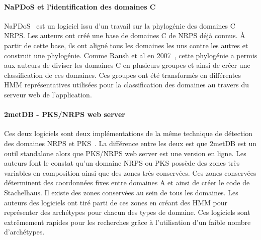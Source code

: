 \documentclass[12pt,french,twoside]{report}
\begin{document}
\paragraph{NaPDoS et l'identification des domaines C}
NaPDoS~\cite{ziemert_natural_2012} est un logiciel issu d'un travail sur la phylogénie des domaines C NRPS.
Les auteurs ont créé une base de domaines C de NRPS déjà connus.
À partir de cette base, ils ont aligné tous les domaines les uns contre les autres et construit une phylogénie.
Comme Raush et al en 2007~\cite{rausch_phylogenetic_2007}, cette phylogénie a permis aux auteurs de diviser les domaines C en plusieurs groupes et ainsi de créer une classification de ces domaines.
Ces groupes ont été transformés en différentes HMM représentatives utilisées pour la classification des domaines au travers du serveur web de l'application.


\paragraph{2metDB - PKS/NRPS web server}
Ces deux logiciels sont deux implémentations de la même technique de détection des domaines NRPS et PKS~\cite{bachmann_chapter_2009}.
La différence entre les deux est que 2metDB est un outil standalone alors que PKS/NRPS web server est une version en ligne.
Les auteurs font le constat qu'un domaine NRPS ou PKS possède des zones très variables en composition ainsi que des zones très conservées.
Ces zones conservées déterminent des coordonnées fixes entre domaines A et ainsi de créer le code de Stachelhaus.
Il existe des zones conservées au sein de tous les domaines.
Les auteurs des logiciels ont tiré parti de ces zones en créant des HMM pour représenter des archétypes pour chacun des types de domaine.
Ces logiciels sont extrêmement rapides pour les recherches grâce à l'utilisation d'un faible nombre d'archétypes.


\end{document}
